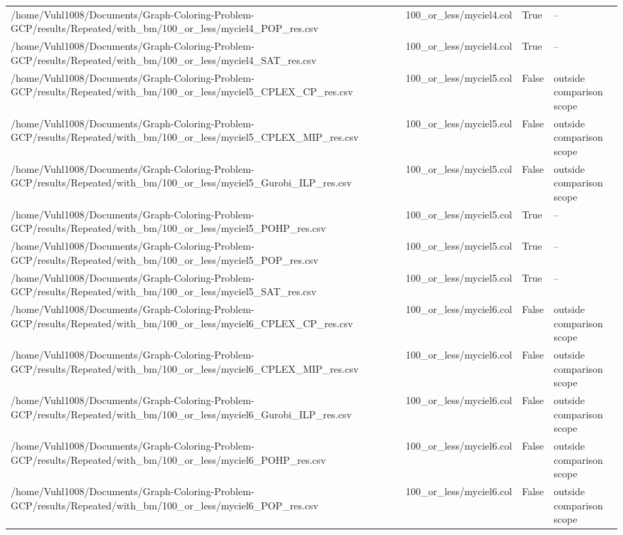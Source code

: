 \begin{table}[htbp]
\begin{tabular}{llll}
/home/Vuhl1008/Documents/Graph-Coloring-Problem-GCP/results/Repeated/with\_bm/100\_or\_less/myciel4\_POP\_res.csv & 100\_or\_less/myciel4.col & True & -- \\
/home/Vuhl1008/Documents/Graph-Coloring-Problem-GCP/results/Repeated/with\_bm/100\_or\_less/myciel4\_SAT\_res.csv & 100\_or\_less/myciel4.col & True & -- \\
/home/Vuhl1008/Documents/Graph-Coloring-Problem-GCP/results/Repeated/with\_bm/100\_or\_less/myciel5\_CPLEX\_CP\_res.csv & 100\_or\_less/myciel5.col & False & outside comparison scope \\
/home/Vuhl1008/Documents/Graph-Coloring-Problem-GCP/results/Repeated/with\_bm/100\_or\_less/myciel5\_CPLEX\_MIP\_res.csv & 100\_or\_less/myciel5.col & False & outside comparison scope \\
/home/Vuhl1008/Documents/Graph-Coloring-Problem-GCP/results/Repeated/with\_bm/100\_or\_less/myciel5\_Gurobi\_ILP\_res.csv & 100\_or\_less/myciel5.col & False & outside comparison scope \\
/home/Vuhl1008/Documents/Graph-Coloring-Problem-GCP/results/Repeated/with\_bm/100\_or\_less/myciel5\_POHP\_res.csv & 100\_or\_less/myciel5.col & True & -- \\
/home/Vuhl1008/Documents/Graph-Coloring-Problem-GCP/results/Repeated/with\_bm/100\_or\_less/myciel5\_POP\_res.csv & 100\_or\_less/myciel5.col & True & -- \\
/home/Vuhl1008/Documents/Graph-Coloring-Problem-GCP/results/Repeated/with\_bm/100\_or\_less/myciel5\_SAT\_res.csv & 100\_or\_less/myciel5.col & True & -- \\
/home/Vuhl1008/Documents/Graph-Coloring-Problem-GCP/results/Repeated/with\_bm/100\_or\_less/myciel6\_CPLEX\_CP\_res.csv & 100\_or\_less/myciel6.col & False & outside comparison scope \\
/home/Vuhl1008/Documents/Graph-Coloring-Problem-GCP/results/Repeated/with\_bm/100\_or\_less/myciel6\_CPLEX\_MIP\_res.csv & 100\_or\_less/myciel6.col & False & outside comparison scope \\
/home/Vuhl1008/Documents/Graph-Coloring-Problem-GCP/results/Repeated/with\_bm/100\_or\_less/myciel6\_Gurobi\_ILP\_res.csv & 100\_or\_less/myciel6.col & False & outside comparison scope \\
/home/Vuhl1008/Documents/Graph-Coloring-Problem-GCP/results/Repeated/with\_bm/100\_or\_less/myciel6\_POHP\_res.csv & 100\_or\_less/myciel6.col & False & outside comparison scope \\
/home/Vuhl1008/Documents/Graph-Coloring-Problem-GCP/results/Repeated/with\_bm/100\_or\_less/myciel6\_POP\_res.csv & 100\_or\_less/myciel6.col & False & outside comparison scope \\

\end{tabular}
\end{table}
